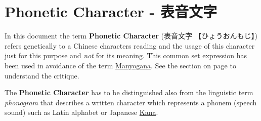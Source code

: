 \section{Phonetic Character - 表音文字} \label{sec:PhoneticCharacter}

In this document the term \textbf{Phonetic Character} ({表音文字}
{【ひょうおんもじ】}) refers genetically to a Chinese characters reading and
the usage of this character just for this purpose and \textit{not} for its
meaning. This common set expression has been used in avoidance of the term
\hyperref[sec:Manyogana]{Manyogana}. See the section  on
page \pageref{sec:Manyogana} to understand the critique.

The \textbf{Phonetic Character} has to be distinguished also from the
linguistic term \textit{phonogram} that describes a written character which
represents a phonem (speech sound) such as Latin alphabet or Japanese
\hyperref[sec:Kana]{Kana}. 

